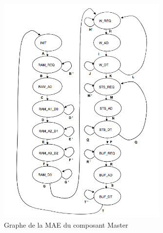 \documentclass{article}
\begin{document}
\begin{figure}[H]
\includegraphics[width=0.75\textwidth]{pics/mae_master.png}
\centering
\caption{Graphe de la MAE du composant Master}
\label{mae_ram}
\end{figure}
\end{document}
